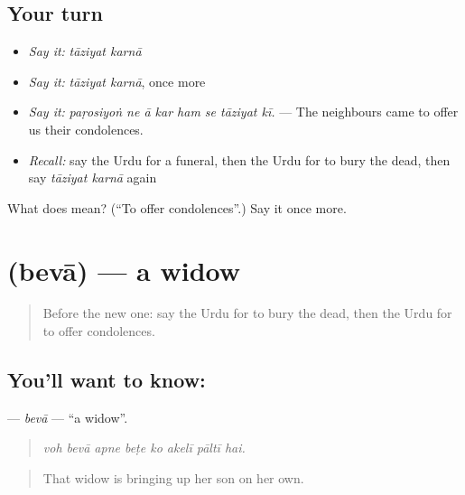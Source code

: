 \subsection*{Your turn}
\begin{itemize}
\raggedright
  \item \emph{Say it:} \emph{tāziyat karnā}
  \item \emph{Say it:} \emph{tāziyat karnā}, once more
  \item \emph{Say it:} \emph{paṛosiyoṅ ne ā kar ham se tāziyat kī.} — The neighbours came to offer us their condolences.
  \item \emph{Recall:} say the Urdu for a funeral, then the Urdu for to bury the dead, then say \emph{tāziyat karnā} again
\end{itemize}

\begin{tcolorbox}[breakable,colback=teal!4,colframe=teal!35!black,title={Before you move on}]
What does   mean? (\textquotedblleft{}To offer condolences\textquotedblright{}.) Say it once more.
\end{tcolorbox}
\section[\texorpdfstring{\ur{بیوہ} (bevā)}{بیوہ (bevā)}]{ (bevā) — a widow}

\label{lesson:UR-C493-beva}



\begin{quote}
Before the new one: say the Urdu for to bury the dead, then the Urdu for to offer condolences.
\end{quote}

\subsection*{You'll want to know: }
\textbf{} — \emph{bevā} — \textquotedblleft{}a widow\textquotedblright{}.

\begin{quote}
       
\end{quote}

\begin{quote}
\emph{voh bevā apne beṭe ko akelī pāltī hai.}
\end{quote}

\begin{quote}
That widow is bringing up her son on her own.
\end{quote}

